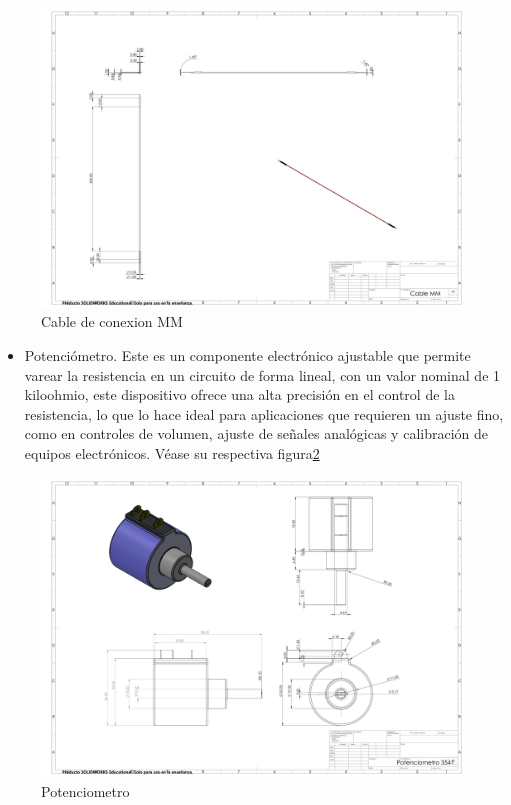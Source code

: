     \begin{figure}[H]
        \centering
        \includegraphics[trim = {10mm 10mm 10mm 10mm},clip,scale=0.120]{24/Img/cabledeConexionmm.pdf}
        \caption{Cable de conexion MM}
        \label{fig:Cable de conexion MM}
    \end{figure}
    \begin{itemize}
        \item 
        Potenciómetro. Este es un componente electrónico ajustable que permite varear la resistencia en un circuito de forma lineal, con un valor nominal de 1 kiloohmio, este dispositivo ofrece una alta precisión en el control de la resistencia, lo que lo hace ideal para aplicaciones que requieren un ajuste fino, como en controles de volumen, ajuste de señales analógicas y calibración de equipos electrónicos. Véase su respectiva figura\ref{fig:Potenciometro}
    \end{itemize}
    \begin{figure}[H]
        \centering
        \includegraphics[trim = {10mm 10mm 10mm 10mm},clip,scale=0.120]{24/Img/Potenciometro.pdf}
        \caption{Potenciometro}
        \label{fig:Potenciometro}
    \end{figure}
